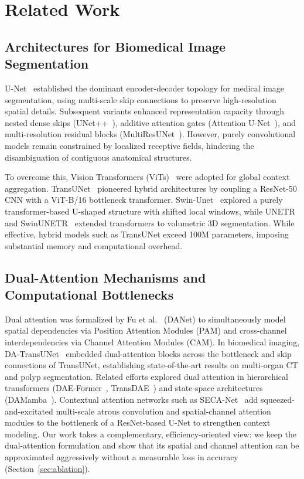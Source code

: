 \section{Related Work}
\label{sec:related_work}

\subsection{Architectures for Biomedical Image Segmentation}
U-Net~\cite{ronneberger2015unet} established the dominant encoder-decoder topology for medical image segmentation, using multi-scale skip connections to preserve high-resolution spatial details. Subsequent variants enhanced representation capacity through nested dense skips (UNet++~\cite{zhou2018unetpp}), additive attention gates (Attention U-Net~\cite{oktay2018attention}), and multi-resolution residual blocks (MultiResUNet~\cite{ibtehaz2020multiresunet}). However, purely convolutional models remain constrained by localized receptive fields, hindering the disambiguation of contiguous anatomical structures.

To overcome this, Vision Transformers (ViTs)~\cite{dosovitskiy2020image} were adopted for global context aggregation. TransUNet~\cite{chen2021transunet} pioneered hybrid architectures by coupling a ResNet-50 CNN with a ViT-B/16 bottleneck transformer. Swin-Unet~\cite{cao2022swinunet} explored a purely transformer-based U-shaped structure with shifted local windows, while UNETR~\cite{hatamizadeh2022unetr} and SwinUNETR~\cite{hatamizadeh2022swinunetr} extended transformers to volumetric 3D segmentation. While effective, hybrid models such as TransUNet exceed 100M parameters, imposing substantial memory and computational overhead.

\subsection{Dual-Attention Mechanisms and Computational Bottlenecks}
Dual attention was formalized by Fu et al.~\cite{fu2019dual} (DANet) to simultaneously model spatial dependencies via Position Attention Modules (PAM) and cross-channel interdependencies via Channel Attention Modules (CAM). In biomedical imaging, DA-TransUNet~\cite{sun2024datransunet} embedded dual-attention blocks across the bottleneck and skip connections of TransUNet, establishing state-of-the-art results on multi-organ CT and polyp segmentation. Related efforts explored dual attention in hierarchical transformers (DAE-Former~\cite{azad2023daeformer}, TransDAE~\cite{azad2024transdae}) and state-space architectures (DAMamba~\cite{ding2025damamba}). Contextual attention networks such as SECA-Net~\cite{zhu2024secanet} add squeezed-and-excitated multi-scale atrous convolution and spatial-channel attention modules to the bottleneck of a ResNet-based U-Net to strengthen context modeling. Our work takes a complementary, efficiency-oriented view: we keep the dual-attention formulation and show that its spatial and channel attention can be approximated aggressively without a measurable loss in accuracy (Section~\ref{sec:ablation}).

